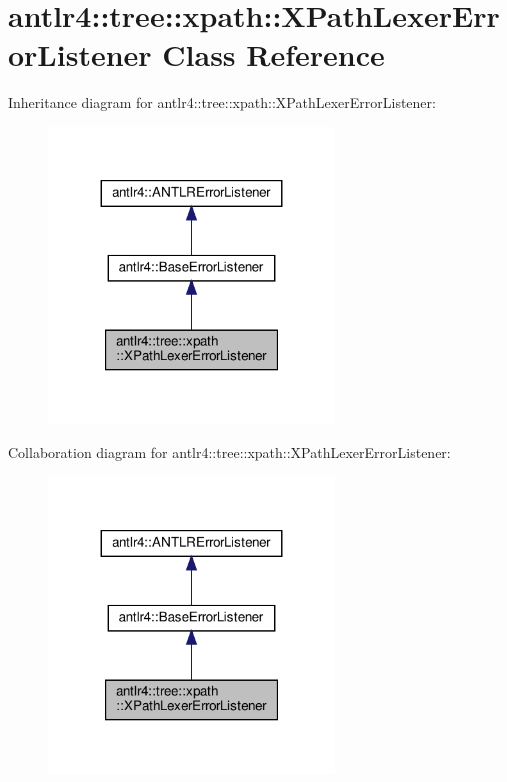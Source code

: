 \hypertarget{classantlr4_1_1tree_1_1xpath_1_1XPathLexerErrorListener}{}\section{antlr4\+:\+:tree\+:\+:xpath\+:\+:X\+Path\+Lexer\+Error\+Listener Class Reference}
\label{classantlr4_1_1tree_1_1xpath_1_1XPathLexerErrorListener}


Inheritance diagram for antlr4\+:\+:tree\+:\+:xpath\+:\+:X\+Path\+Lexer\+Error\+Listener\+:
\nopagebreak
\begin{figure}[H]
\begin{center}
\leavevmode
\includegraphics[width=215pt]{classantlr4_1_1tree_1_1xpath_1_1XPathLexerErrorListener__inherit__graph}
\end{center}
\end{figure}


Collaboration diagram for antlr4\+:\+:tree\+:\+:xpath\+:\+:X\+Path\+Lexer\+Error\+Listener\+:
\nopagebreak
\begin{figure}[H]
\begin{center}
\leavevmode
\includegraphics[width=215pt]{classantlr4_1_1tree_1_1xpath_1_1XPathLexerErrorListener__coll__graph}
\end{center}
\end{figure}
